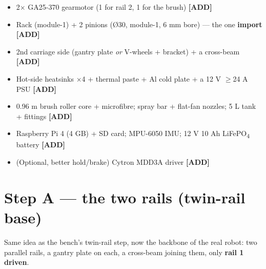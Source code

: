 \documentclass[11pt,a4paper]{article}
\newcommand{\addp}{\textcolor{orange!85!black}{\textbf{[ADD]}}}
\begin{document}
\begin{itemize}[leftmargin=*,itemsep=1pt]
  \item 2$\times$ GA25-370 gearmotor (1 for rail 2, 1 for the brush) \addp
  \item Rack (module-1) + 2 pinions (\O30, module-1, 6 mm bore) --- the one \textbf{import} \addp
  \item 2nd carriage side (gantry plate \emph{or} V-wheels + bracket) + a cross-beam \addp
  \item Hot-side heatsinks $\times$4 + thermal paste + Al cold plate + a 12 V $\geq$24 A PSU \addp
  \item 0.96 m brush roller core + microfibre; spray bar + flat-fan nozzles; 5 L tank + fittings \addp
  \item Raspberry Pi 4 (4 GB) + SD card; MPU-6050 IMU; 12 V 10 Ah LiFePO\textsubscript{4} battery \addp
  \item (Optional, better hold/brake) Cytron MDD3A driver \addp
\end{itemize}

\section{Step A --- the two rails (twin-rail base)}

Same idea as the bench's twin-rail step, now the backbone of the real robot: two parallel rails, a gantry
plate on each, a cross-beam joining them, only \textbf{rail 1 driven}.
\end{document}
